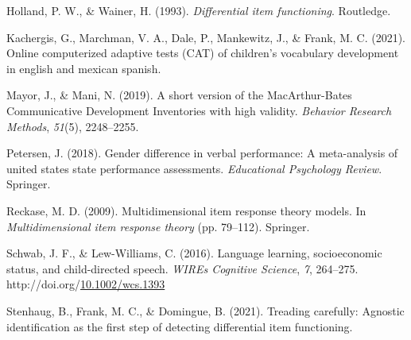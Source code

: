 \documentclass[10pt, letterpaper]{article}
\newenvironment{CSLReferences}%
  {}%
  {\par}
\begin{document}
\begin{CSLReferences}{1}{0}
\leavevmode\hypertarget{ref-holland1993differential}{}%
Holland, P. W., \& Wainer, H. (1993). \emph{Differential item
functioning}. Routledge.

\leavevmode\hypertarget{ref-kachergis2021cat}{}%
Kachergis, G., Marchman, V. A., Dale, P., Mankewitz, J., \& Frank, M. C.
(2021). Online computerized adaptive tests (CAT) of children's
vocabulary development in english and mexican spanish.

\leavevmode\hypertarget{ref-mayor2019}{}%
Mayor, J., \& Mani, N. (2019). A short version of the
{M}ac{A}rthur-{B}ates {C}ommunicative {D}evelopment {I}nventories with
high validity. \emph{Behavior Research Methods}, \emph{51}(5),
2248--2255.

\leavevmode\hypertarget{ref-petersen2018gender}{}%
Petersen, J. (2018). Gender difference in verbal performance: A
meta-analysis of united states state performance assessments.
\emph{Educational Psychology Review}. Springer.

\leavevmode\hypertarget{ref-reckase2009}{}%
Reckase, M. D. (2009). Multidimensional item response theory models. In
\emph{Multidimensional item response theory} (pp. 79--112). Springer.

\leavevmode\hypertarget{ref-schwab2016}{}%
Schwab, J. F., \& Lew-Williams, C. (2016). Language learning,
socioeconomic status, and child-directed speech. \emph{WIREs Cognitive
Science}, \emph{7}, 264--275.
http://doi.org/\href{https://doi.org/10.1002/wcs.1393}{10.1002/wcs.1393}

\leavevmode\hypertarget{ref-stenhaug2021treading}{}%
Stenhaug, B., Frank, M. C., \& Domingue, B. (2021). Treading carefully:
Agnostic identification as the first step of detecting differential item
functioning.

\end{CSLReferences}


\end{document}
